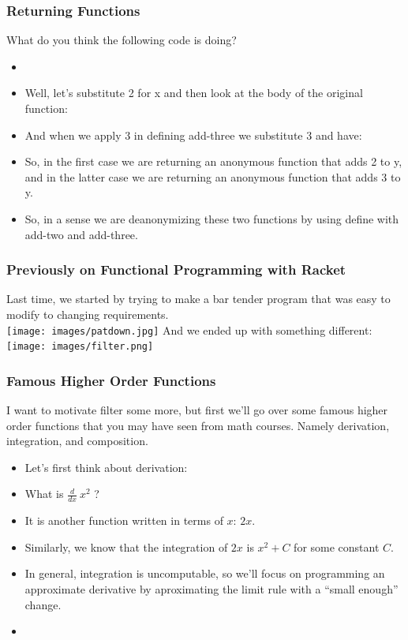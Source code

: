 \documentclass{beamer}
\begin{document}
\begin{frame}
  \frametitle{Returning Functions}
  What do you think the following code is doing?
  \begin{itemize}
  \item<2-> \Factory
  \item<3-> Well, let's substitute 2 for x and then look at the body
    of the original function:
    \SubTwo
  \item<4-> And when we apply 3 in defining add-three we substitute 3
    and have:
    \SubThree
  \item<5-> So, in the first case we are returning an anonymous function
    that adds 2 to y, and in the latter case we are returning an anonymous
    function that adds 3 to y.
  \item<6-> So, in a sense we are deanonymizing these two functions by
    using define with add-two and add-three.
  \end{itemize}
\end{frame}


\begin{frame}
  \frametitle{Previously on Functional Programming with Racket}
  Last time, we started by trying to make a bar tender program that was easy
  to modify to changing requirements.\\
  \texttt{[image: images/patdown.jpg]}
  \pause
  And we ended up with something different:\\
  \texttt{[image: images/filter.png]}
\end{frame}

\begin{frame}
  \frametitle{Famous Higher Order Functions}
  I want to motivate filter some more, but first we'll go over some famous
  higher order functions that you may have seen from math courses.
  Namely derivation, integration, and composition.
  \begin{itemize}
  \item<2-> Let's first think about derivation:
  \item<3-> What is $\frac{d}{dx}~x^2$ ?
  \item<4-> It is another function written in terms of $x$:
    $2x$.
  \item<5-> Similarly, we know that the integration of $2x$ is
    $x^2 + C$ for some constant $C$.
  \item<6-> In general, integration is uncomputable, so we'll focus
    on programming an approximate derivative by aproximating the limit
    rule with a ``small enough'' change.
  \item<7-> \deriv
  \end{itemize}
\end{frame}
\end{document}
